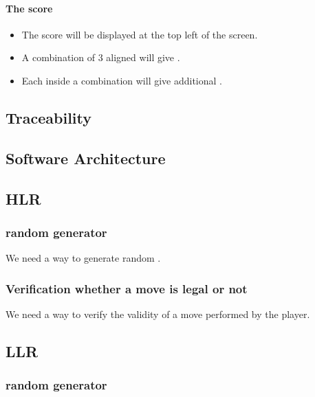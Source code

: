 \paragraph{The score}

\begin{itemize}
\item The score will be displayed at the top left of the screen.
\item A combination of 3 aligned \sqs will give \threepts \pts.
\item Each \sq inside a combination will give \sqpts additional \pts.
\end{itemize}

\subsection{Traceability}

\subsection{Software Architecture}

\subsection{HLR}

\subsubsection{random \sq generator}

We need a way to generate random \sqs.

\subsubsection{Verification whether a move is legal or not}

We need a way to verify the validity of a move performed by the player.

\subsection{LLR}

\subsubsection{random \sq generator}



